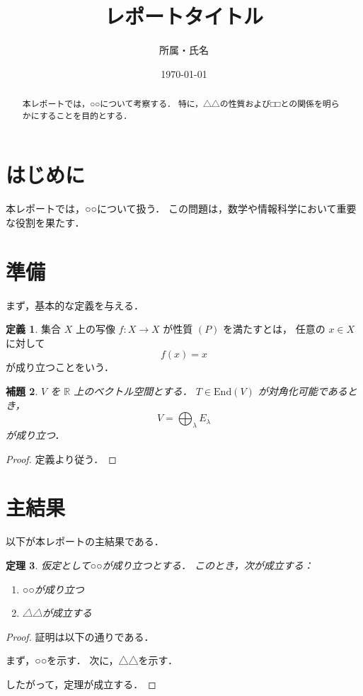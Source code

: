 \documentclass[a4paper,11pt]{ltjsarticle}
\title{\bfseries レポートタイトル}
\author{所属・氏名}
\date{\today}
\theoremstyle{plain}
\newtheorem{theorem}{定理}[section]
\newtheorem{lemma}[theorem]{補題}
\theoremstyle{definition}
\newtheorem{definition}[theorem]{定義}
\theoremstyle{remark}
\newcommand{\R}{\mathbb{R}}
\begin{document}
\maketitle

\begin{abstract}
本レポートでは，○○について考察する．
特に，△△の性質および□□との関係を明らかにすることを目的とする．
\end{abstract}

\section{はじめに}

本レポートでは，○○について扱う．
この問題は，数学や情報科学において重要な役割を果たす．

\section{準備}

まず，基本的な定義を与える．

\begin{definition}
集合 $X$ 上の写像 $f : X \to X$ が性質 $(P)$ を満たすとは，
任意の $x \in X$ に対して
\[
  f(x) = x
\]
が成り立つことをいう．
\end{definition}

\begin{lemma}
$V$ を $\R$ 上のベクトル空間とする．
$T \in \mathrm{End}(V)$ が対角化可能であるとき，
\[
  V = \bigoplus_{\lambda} E_{\lambda}
\]
が成り立つ．
\end{lemma}

\begin{proof}
定義より従う．
\end{proof}

\section{主結果}

以下が本レポートの主結果である．

\begin{theorem}
仮定として○○が成り立つとする．
このとき，次が成立する：
\begin{enumerate}[label=(\arabic*)]
  \item ○○が成り立つ
  \item △△が成立する
\end{enumerate}
\end{theorem}

\begin{proof}
証明は以下の通りである．

まず，○○を示す．
次に，△△を示す．

したがって，定理が成立する．
\end{proof}
\end{document}
